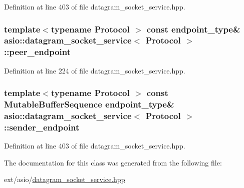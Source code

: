Definition at line 403 of file datagram\+\_\+socket\+\_\+service.\+hpp.

\hypertarget{classasio_1_1datagram__socket__service_ab24dc251be100ee0976e78abfe5946a3}{}
\subsubsection[{peer\+\_\+endpoint}]{\setlength{\rightskip}{0pt plus 5cm}template$<$typename Protocol $>$ const {\bf endpoint\+\_\+type}\& {\bf asio\+::datagram\+\_\+socket\+\_\+service}$<$ Protocol $>$\+::peer\+\_\+endpoint}\label{classasio_1_1datagram__socket__service_ab24dc251be100ee0976e78abfe5946a3}


Definition at line 224 of file datagram\+\_\+socket\+\_\+service.\+hpp.

\hypertarget{classasio_1_1datagram__socket__service_a5bfcc5dd1de590bc5c55e0c19db18773}{}
\subsubsection[{sender\+\_\+endpoint}]{\setlength{\rightskip}{0pt plus 5cm}template$<$typename Protocol $>$ const Mutable\+Buffer\+Sequence {\bf endpoint\+\_\+type}\& {\bf asio\+::datagram\+\_\+socket\+\_\+service}$<$ Protocol $>$\+::sender\+\_\+endpoint}\label{classasio_1_1datagram__socket__service_a5bfcc5dd1de590bc5c55e0c19db18773}


Definition at line 403 of file datagram\+\_\+socket\+\_\+service.\+hpp.



The documentation for this class was generated from the following file\+:\begin{DoxyCompactItemize}
\item 
ext/asio/\hyperlink{datagram__socket__service_8hpp}{datagram\+\_\+socket\+\_\+service.\+hpp}\end{DoxyCompactItemize}
